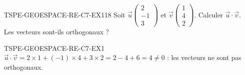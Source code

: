 

\begin{exercice}{TSPE-GEOESPACE-RE-C7-EX1}{1}{8}
Soit $\vec{u}\begin{pmatrix}2\\-1\\3\end{pmatrix}$ et $\vec{v}\begin{pmatrix}1\\4\\2\end{pmatrix}$. Calculer $\vec{u}\cdot\vec{v}$. Les vecteurs sont-ils orthogonaux ?
\end{exercice}


\begin{corrige}{TSPE-GEOESPACE-RE-C7-EX1}
$\vec{u}\cdot\vec{v} = 2\times1+(-1)\times4+3\times2 = 2-4+6 = 4
\neq 0$ : les vecteurs ne sont pas orthogonaux.
\end{corrige}
